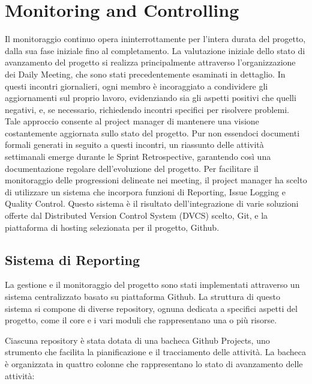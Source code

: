\chapter{Monitoring and Controlling}

Il monitoraggio continuo opera ininterrottamente per l'intera durata del progetto, dalla sua fase iniziale fino al completamento. La valutazione iniziale dello stato di avanzamento del progetto si realizza principalmente attraverso l'organizzazione dei Daily Meeting, che sono stati precedentemente esaminati in dettaglio. In questi incontri giornalieri, ogni membro è incoraggiato a condividere gli aggiornamenti sul proprio lavoro, evidenziando sia gli aspetti positivi che quelli negativi, e, se necessario, richiedendo incontri specifici per risolvere problemi. Tale approccio consente al project manager di mantenere una visione costantemente aggiornata sullo stato del progetto. Pur non essendoci documenti formali generati in seguito a questi incontri, un riassunto delle attività settimanali emerge durante le Sprint Retrospective, garantendo così una documentazione regolare dell'evoluzione del progetto. Per facilitare il monitoraggio delle progressioni delineate nei meeting, il project manager ha scelto di utilizzare un sistema che incorpora funzioni di Reporting, Issue Logging e Quality Control. Questo sistema è il risultato dell'integrazione di varie soluzioni offerte dal Distributed Version Control System (DVCS) scelto, Git, e la piattaforma di hosting selezionata per il progetto, Github.

\section{Sistema di Reporting}

La gestione e il monitoraggio del progetto sono stati implementati attraverso un sistema centralizzato basato su piattaforma Github. La struttura di questo sistema si compone di diverse repository, ognuna dedicata a specifici aspetti del progetto, come il core e i vari moduli che rappresentano una o più risorse.

Ciascuna repository è stata dotata di una bacheca Github Projects, uno strumento che facilita la pianificazione e il tracciamento delle attività. La bacheca è organizzata in quattro colonne che rappresentano lo stato di avanzamento delle attività:

